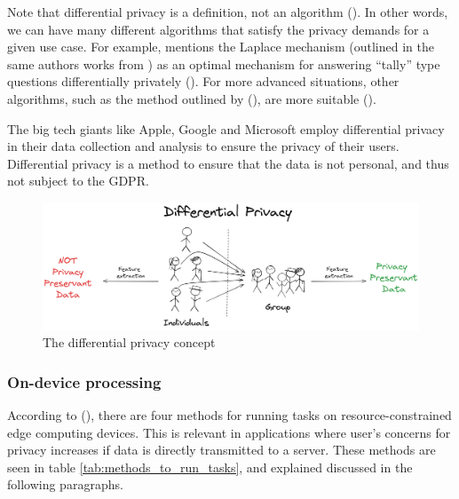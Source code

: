 Note that differential privacy is a definition, not an algorithm (\cite{dw2011DifferentialP}). In other words, we can have many different algorithms that satisfy the privacy demands for a given use case. For example, \citeauthor{dw2011DifferentialP} mentions the Laplace mechanism (outlined in the same authors works from \citeyear{dw2006noise2sensitivity-laplace}) as an optimal mechanism for answering “tally” type questions differentially privately (\citeyear{dw2011DifferentialP}). For more advanced situations, other algorithms, such as the method outlined by \citeauthor{bl2011learning-privacy} (\citeyear{bl2011learning-privacy}), are more suitable (\cite{dw2011DifferentialP}).

The big tech giants like Apple, Google and Microsoft employ differential privacy in their data collection and analysis to ensure the privacy of their users. Differential privacy is a method to ensure that the data is not personal, and thus not subject to the GDPR.

\begin{figure}[H]
    \centering
    \includegraphics[width=\linewidth]{Images/Diagrams/differential-privacy.png}
    \caption{The differential privacy concept}
    \label{fig:differential-privacy}
\end{figure}

\subsubsection{On-device processing}
According to \citeauthor{hu2022accurateobjectdetectionatedge} (\citeyear{hu2022accurateobjectdetectionatedge}), there are four methods for running tasks on resource-constrained edge computing devices. This is relevant in applications where user's concerns for privacy increases if data is directly transmitted to a server. These methods are seen in table \ref{tab:methods_to_run_tasks}, and explained discussed in the following paragraphs.

